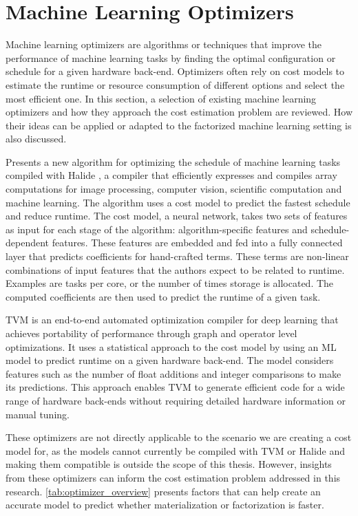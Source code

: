 \section{Machine Learning Optimizers}
\label{sec:3-ml-optimizers}
Machine learning optimizers are algorithms or techniques that improve the performance of machine learning tasks by finding the optimal configuration or schedule for a given hardware back-end. Optimizers often rely on cost models to estimate the runtime or resource consumption of different options and select the most efficient one. In this section, a selection of existing machine learning optimizers and how they approach the cost estimation problem are reviewed. How their ideas can be applied or adapted to the factorized machine learning setting is also discussed.

\cite{halide_cost_model} Presents a new algorithm for optimizing the schedule of machine learning tasks compiled with Halide \cite{halide_examples}, a compiler that efficiently expresses and compiles array computations for image processing, computer vision, scientific computation and machine learning. The algorithm uses a cost model to predict the fastest schedule and reduce runtime. The cost model, a neural network, takes two sets of features as input for each stage of the algorithm: algorithm-specific features and schedule-dependent features. These features are embedded and fed into a fully connected layer that predicts coefficients for hand-crafted terms. These terms are non-linear combinations of input features that the authors expect to be related to runtime. Examples are tasks per core, or the number of times storage is allocated. The computed coefficients are then used to predict the runtime of a given task.

TVM \cite{tvm} is an end-to-end automated optimization compiler for deep learning that achieves portability of performance through graph and operator level optimizations. It uses a statistical approach to the cost model by using an ML model to predict runtime on a given hardware back-end. The model considers features such as the number of float additions and integer comparisons to make its predictions. This approach enables TVM to generate efficient code for a wide range of hardware back-ends without requiring detailed hardware information or manual tuning.

These optimizers are not directly applicable to the scenario we are creating a cost model for, as the models cannot currently be compiled with TVM or Halide and making them compatible is outside the scope of this thesis. However, insights from these optimizers can inform the cost estimation problem addressed in this research. \autoref{tab:optimizer_overview} presents factors that can help create an accurate model to predict whether materialization or factorization is faster.

